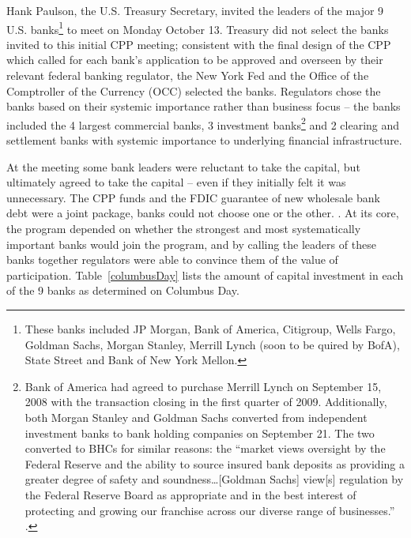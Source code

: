 \documentclass[12pt]{article}
\begin{document}
Hank Paulson, the U.S. Treasury Secretary, invited the leaders of the major 9 U.S. banks\footnote{These banks included JP Morgan, Bank of America, Citigroup, Wells Fargo, Goldman Sachs, Morgan Stanley, Merrill Lynch (soon to be quired by BofA), State Street and Bank of New York Mellon.} to meet on Monday October 13. Treasury did not select the banks invited to this initial CPP meeting; consistent with the final design of the CPP which called for each bank's application to be approved and overseen by their relevant federal banking regulator, the New York Fed and the Office of the Comptroller of the Currency (OCC) selected the banks. Regulators chose the banks based on their systemic importance rather than business focus -- the banks included the 4 largest commercial banks, 3 investment banks\footnote{Bank of America had agreed to purchase Merrill Lynch on September 15, 2008 with the transaction closing in the first quarter of 2009. Additionally, both Morgan Stanley and Goldman Sachs converted from independent investment banks to bank holding companies on September 21. The two converted to BHCs for similar reasons: the ``market views oversight by the Federal Reserve and the ability to source insured bank deposits as providing a greater degree of safety and soundness\dots [Goldman Sachs] view[s] regulation by the Federal Reserve Board as appropriate and in the best interest of protecting and growing our franchise across our diverse range of businesses.'' \citep{GSBHC}.} and 2 clearing and settlement banks with systemic importance to underlying financial infrastructure.

At the meeting some bank leaders were reluctant to take the capital, but ultimately agreed to take the capital -- even if they initially felt it was unnecessary. The CPP funds and the FDIC guarantee of new wholesale bank debt were a joint package, banks could not choose one or the other. \citep{Geithner}. At its core, the program depended on whether the strongest and most systematically important banks would join the program, and by calling the leaders of these banks together regulators were able to convince them of the value of participation. Table~\ref{columbusDay} lists the amount of capital investment in each of the 9 banks as determined on Columbus Day.
\end{document}
